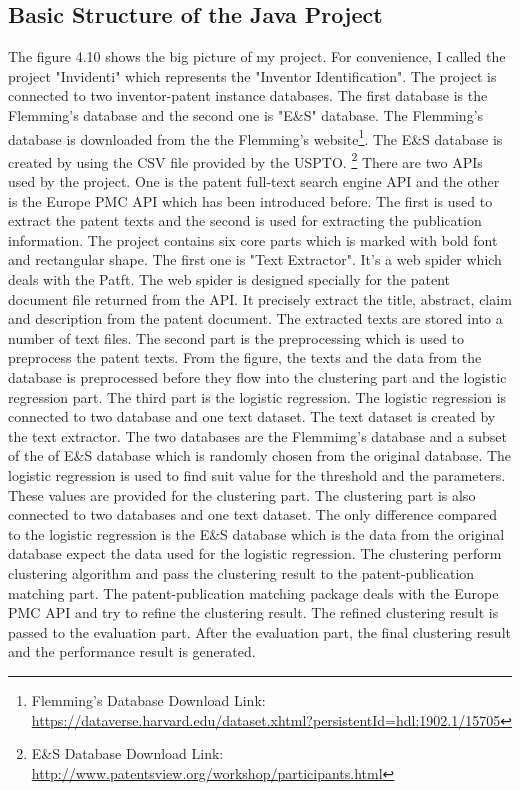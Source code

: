 \subsection{Basic Structure of the Java Project}
The figure 4.10 shows the big picture of my project. For convenience, I called the project "Invidenti" which represents the "Inventor Identification". The project is connected to two inventor-patent instance databases. The first database is the Flemming's database and the second one is "E\&S" database. The Flemming's database is downloaded from the the Flemming's website\footnote{Flemming's Database Download Link: \url{https://dataverse.harvard.edu/dataset.xhtml?persistentId=hdl:1902.1/15705}}. The E\&S database is created by using the CSV file provided by the USPTO. \footnote{E\&S Database Download Link: \url {http://www.patentsview.org/workshop/participants.html} } There are two APIs used by the project. One is the patent full-text search engine API and the other is the Europe PMC API which has been introduced before. The first is used to extract the patent texts and the second is used for extracting the publication information. The project contains six core parts which is marked with bold font and rectangular shape. The first one is "Text Extractor". It's a web spider which deals with the Patft. The web spider is designed specially for the patent document file returned from the API. It precisely extract the title, abstract, claim and description from the patent document. The extracted texts are stored into a number of text files. The second part is the preprocessing which is used to preprocess the patent texts.  From the figure, the texts and the data from the database is preprocessed before they flow into the clustering part and the logistic regression part. The third part is the logistic regression. The logistic regression  is connected to two database and one text dataset. The text dataset is created by the text extractor. The two databases are the Flemmimg's database and a subset of the of E\&S database which is randomly chosen from the original database. The logistic regression is used to find suit value for the threshold and the parameters. These values are provided for the clustering part. The clustering part is also connected to two databases and one text dataset. The only difference compared to the logistic regression is the E\&S database which is the data from the original database expect the data used for the logistic regression. The clustering perform clustering algorithm and pass the clustering result to the patent-publication matching part. The patent-publication matching package deals with the Europe PMC API and try to refine the clustering result. The refined clustering result is passed to the evaluation part. After the evaluation part, the final clustering result and the performance result is generated.   

